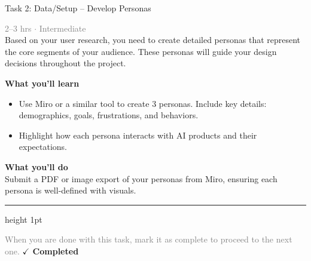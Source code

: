 \documentclass[10pt,a4paper]{article}
\begin{document}
\begin{taskbox}{Task 2: Data/Setup – Develop Personas}

    {\small \textcolor{gray}{2--3 hrs $\cdot$ Intermediate}}\\[12pt]

      
Based on your user research, you need to create detailed personas that represent the core segments of your audience. These personas will guide your design decisions throughout the project.


\vspace{8pt}
{\large \textbf{\textcolor{brandLight}{What you'll learn}}}\\[4pt]  
\begin{itemize}
    \item Use Miro or a similar tool to create 3 personas. Include key details: demographics, goals, frustrations, and behaviors.  
    \item Highlight how each persona interacts with AI products and their expectations.
\end{itemize}

\vspace{8pt}
{\large \textbf{\textcolor{brandLight}{What you'll do}}}\\[4pt]  
Submit a PDF or image export of your personas from Miro, ensuring each persona is well-defined with visuals.\par

    \vspace{16pt}

    \textcolor{cardBorder}{\hrule height 1pt}\vspace{8pt}

    \small \textcolor{gray}{When you are done with this task, mark it as complete to proceed to the next one.} \hfill \textbf{\textcolor{brandDark}{$\checkmark$ Completed}}

\end{taskbox}
\end{document}

